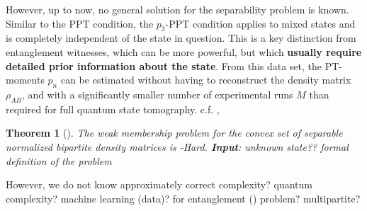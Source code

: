 \documentclass[
aps,
pra,
floatfix,
]{revtex4-2}
\theoremstyle{plain}
\newtheorem{theorem}{Theorem}
\newtheorem{question}{Question}
\theoremstyle{definition}
\newtheorem{problem}{Problem}
\newcommand{\dm}{\rho}
\begin{document}
However, up to now, no general solution for the separability problem is known.
Similar to the PPT condition, the $p_3$-PPT condition applies to mixed states and is completely independent of the state in question. This is a key distinction from entanglement witnesses, which can be more powerful, but which \textbf{usually require detailed prior information about the state}.
From this data set, the PT-moments $p_n$ can be estimated without having to reconstruct the density matrix $\dm_{AB}$, and with a significantly smaller number of experimental runs $M$ than required for full quantum state tomography.
c.f. , 
\begin{theorem}[\cite{gurvitsClassicalDeterministicComplexity2003}]
	The weak membership problem for the convex set of separable normalized bipartite density matrices is -Hard.
	\textbf{Input}: unknown state?? formal definition of the problem
	\cite{ioannouComputationalComplexityQuantum2007}
\end{theorem}
	However, we do not know 
	approximately correct complexity? quantum complexity? machine learning (data)? for entanglement () problem? multipartite?
\end{document}
